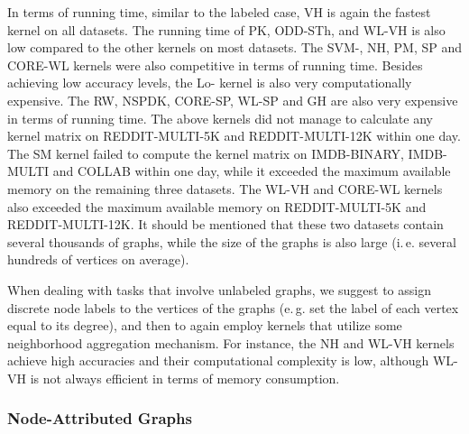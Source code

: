 \documentclass[twoside,11pt]{article}
\newcommand{\eg}{e.\,g. }
\newcommand{\ie}{i.\,e. }
\begin{document}
In terms of running time, similar to the labeled case, VH is again the fastest kernel on all datasets.
The running time of PK, ODD-STh, and WL-VH is also low compared to the other kernels on most datasets.
The SVM-, NH, PM, SP and CORE-WL kernels were also competitive in terms of running time.
Besides achieving low accuracy levels, the Lo- kernel is also very computationally expensive.
The RW, NSPDK, CORE-SP, WL-SP and GH are also very expensive in terms of running time.
The above  kernels did not manage to calculate any kernel matrix on REDDIT-MULTI-5K and REDDIT-MULTI-12K within one day.
The SM kernel failed to compute the kernel matrix on IMDB-BINARY, IMDB-MULTI and COLLAB within one day, while it exceeded the maximum available memory on the remaining three datasets.
The WL-VH and CORE-WL kernels also exceeded the maximum available memory on REDDIT-MULTI-5K and REDDIT-MULTI-12K.
It should be mentioned that these two datasets contain several thousands of graphs, while the size of the graphs is also large (\ie several hundreds of vertices on average).

When dealing with tasks that involve unlabeled graphs, we suggest to assign discrete node labels to the vertices of the graphs (\eg set the label of each vertex equal to its degree), and then to again employ kernels that utilize some neighborhood aggregation mechanism.
For instance, the NH and WL-VH kernels achieve high accuracies and their computational complexity is low, although WL-VH is not always efficient in terms of memory consumption.

\subsubsection{Node-Attributed Graphs}
\end{document}
